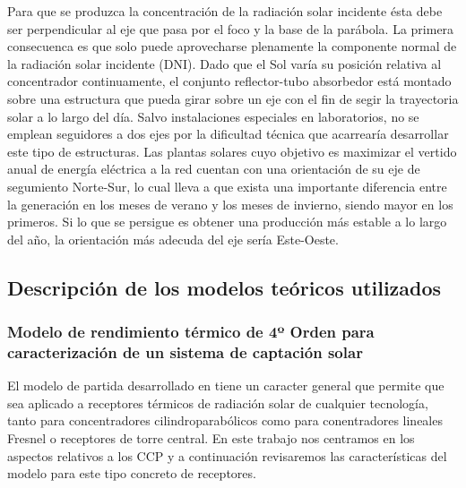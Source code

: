 Para que se produzca la concentración de la radiación solar incidente
ésta debe ser perpendicular al eje que pasa por el foco y la base de la
parábola. La primera consecuenca es que solo puede aprovecharse
plenamente la componente normal de la radiación solar incidente (DNI).
Dado que el Sol varía su posición relativa al concentrador
continuamente, el conjunto reflector-tubo absorbedor está montado sobre
una estructura que pueda girar sobre un eje con el fin de segir la
trayectoria solar a lo largo del día. Salvo instalaciones especiales en
laboratorios, no se emplean seguidores a dos ejes por la dificultad
técnica que acarrearía desarrollar este tipo de estructuras. Las plantas
solares cuyo objetivo es maximizar el vertido anual de energía eléctrica
a la red cuentan con una orientación de su eje de segumiento Norte-Sur,
lo cual lleva a que exista una importante diferencia entre la generación
en los meses de verano y los meses de invierno, siendo mayor en los
primeros. Si lo que se persigue es obtener una producción más estable a
lo largo del año, la orientación más adecuda del eje sería Este-Oeste.

    \hypertarget{descripciuxf3n-de-los-modelos-teuxf3ricos-utilizados}{%
\subsection{Descripción de los modelos teóricos
utilizados}\label{descripciuxf3n-de-los-modelos-teuxf3ricos-utilizados}}

\hypertarget{modelo-de-rendimiento-tuxe9rmico-de-4uxba-orden-para-caracterizaciuxf3n-de-un-sistema-de-captaciuxf3n-solar}{%
\subsubsection{Modelo de rendimiento térmico de 4º Orden para
caracterización de un sistema de captación
solar}\label{modelo-de-rendimiento-tuxe9rmico-de-4uxba-orden-para-caracterizaciuxf3n-de-un-sistema-de-captaciuxf3n-solar}}

El modelo de partida desarrollado en \cite{1022085/7TD8VTGL} tiene un
caracter general que permite que sea aplicado a receptores térmicos de
radiación solar de cualquier tecnología, tanto para concentradores
cilindroparabólicos como para conentradores lineales Fresnel o
receptores de torre central. En este trabajo nos centramos en los
aspectos relativos a los CCP y a continuación revisaremos las
características del modelo para este tipo concreto de receptores.


